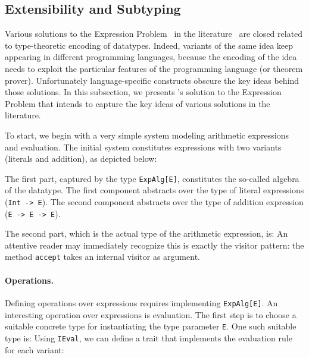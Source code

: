 \subsection{Extensibility and Subtyping}
\label{sec:extensibility}

Various solutions to the Expression Problem~\cite{wadler1998expression} in the
literature~\cite{finally-tagless,oliveira09modular,DelawareOS13,oliveira2012extensibility,
  swierstra:la-carte} are closed related to type-theoretic encoding of
datatypes. Indeed, variants of the same idea keep appearing in different
programming languages, because the encoding of the idea needs to exploit the
particular features of the programming language (or theorem prover).
Unfortunately language-specific constructs obscure the key ideas behind those
solutions. In this subsection, we presents \name's solution to the Expression
Problem that intends to capture the key ideas of various solutions in the
literature.

To start, we begin with a very simple system modeling arithmetic expressions and
evaluation. The initial system constitutes expressions with two variants
(literals and addition), as depicted below:

The first part, captured by the type \lstinline{ExpAlg[E]}, constitutes the
so-called algebra of the datatype. The first component abstracts over the type
of literal expressions (\lstinline{Int -> E}). The second component abstracts
over the type of addition expression (\lstinline{E -> E -> E}).

The second part, which is the actual type of the arithmetic expression, is:
An attentive reader may immediately recognize this is exactly the visitor
pattern: the method \lstinline{accept} takes an internal visitor as argument.



\paragraph{Operations.} Defining operations over expressions requires
implementing \lstinline{ExpAlg[E]}. An interesting operation over expressions is
evaluation. The first step is to choose a suitable concrete type for
instantiating the type parameter \lstinline{E}. One such suitable type is:
Using \lstinline{IEval}, we can define a trait that implements the evaluation
rule for each variant:


